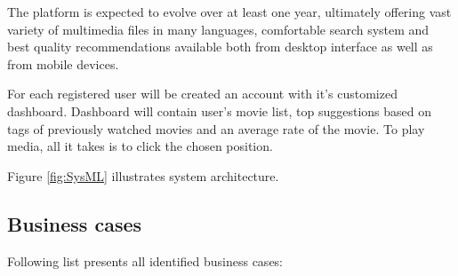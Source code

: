 \documentclass{scrreprt}
\begin{document}
The platform is expected to evolve over at least one year, ultimately offering vast variety of multimedia files in many languages, comfortable search system and best quality recommendations available both from desktop interface as well as from mobile devices.


For each registered user will be created an account with it's customized dashboard. Dashboard will contain user's movie list, top suggestions based on tags of previously watched movies and an average rate of the movie. To play media, all it takes is to click the chosen position. 

Figure \ref{fig:SysML} illustrates system architecture.\\

\subsection{Business cases}

Following list presents all identified business cases:
\end{document}
